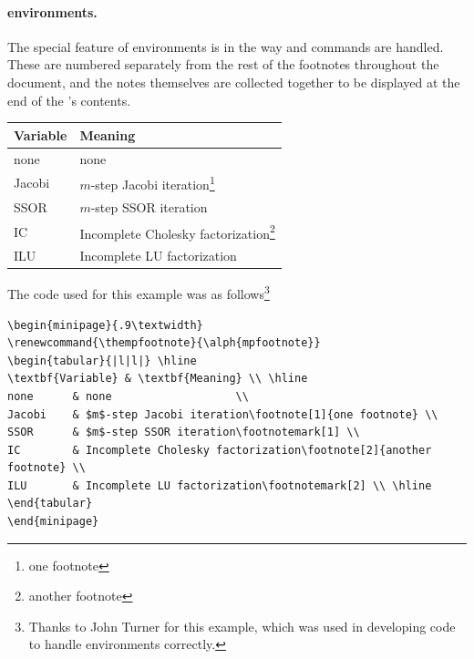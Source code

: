 \medskip
{}%
\html{\\}%
\paragraph*{ environments.}

The special feature of  environments is in the
way  and  commands are handled. 
These are numbered separately from the rest of the footnotes
throughout the document, and the notes themselves are collected together 
to be displayed at the end of the 's contents.

\medskip
\begin{minipage}{.9\textwidth}
\renewcommand{\thempfootnote}{\alph{mpfootnote}}
\begin{tabular}{|l|l|} \hline
\textbf{Variable} & \textbf{Meaning} \\ \hline
none      & none                   \\
Jacobi    & $m$-step Jacobi iteration\footnote[1]{one footnote} \\
SSOR      & $m$-step SSOR iteration\footnotemark[1] \\
IC        & Incomplete Cholesky factorization\footnote[2]{another footnote} \\
ILU       & Incomplete LU factorization\footnotemark[2] \\ \hline
\end{tabular}
\end{minipage}

\bigskip\noindent
The code used for this example was as follows\footnote{%
Thanks to John Turner  for this example, 
which was used in developing
code to handle  environments correctly.}
\begin{small}
\begin{verbatim}
\begin{minipage}{.9\textwidth}
\renewcommand{\thempfootnote}{\alph{mpfootnote}}
\begin{tabular}{|l|l|} \hline
\textbf{Variable} & \textbf{Meaning} \\ \hline
none      & none                   \\
Jacobi    & $m$-step Jacobi iteration\footnote[1]{one footnote} \\
SSOR      & $m$-step SSOR iteration\footnotemark[1] \\
IC        & Incomplete Cholesky factorization\footnote[2]{another footnote} \\
ILU       & Incomplete LU factorization\footnotemark[2] \\ \hline
\end{tabular}
\end{minipage}
\end{verbatim}
\end{small}

